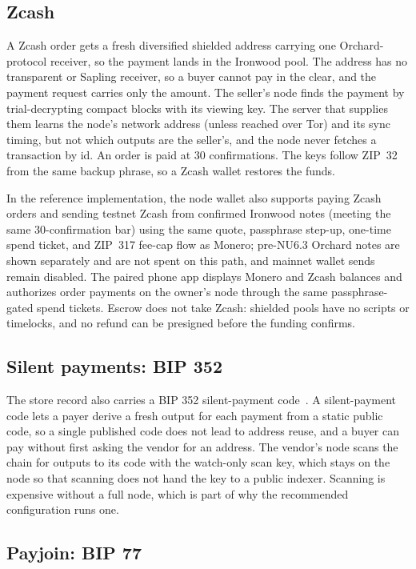 \subsection{Zcash}

A Zcash order gets a fresh diversified shielded address carrying one Orchard-protocol receiver, so the payment lands in the Ironwood pool. The address has no transparent or Sapling receiver, so a buyer cannot pay in the clear, and the payment request carries only the amount. The seller's node finds the payment by trial-decrypting compact blocks with its viewing key. The server that supplies them learns the node's network address (unless reached over Tor) and its sync timing, but not which outputs are the seller's, and the node never fetches a transaction by id. An order is paid at 30 confirmations. The keys follow ZIP~32 from the same backup phrase, so a Zcash wallet restores the funds.

In the reference implementation, the node wallet also supports paying Zcash orders and sending testnet Zcash from confirmed Ironwood notes (meeting the same 30-confirmation bar) using the same quote, passphrase step-up, one-time spend ticket, and ZIP~317 fee-cap flow as Monero; pre-NU6.3 Orchard notes are shown separately and are not spent on this path, and mainnet wallet sends remain disabled. The paired phone app displays Monero and Zcash balances and authorizes order payments on the owner's node through the same passphrase-gated spend tickets. Escrow does not take Zcash: shielded pools have no scripts or timelocks, and no refund can be presigned before the funding confirms.

\subsection{Silent payments: BIP 352}

The store record also carries a BIP 352 silent-payment code~\citep{bip352}. A silent-payment code lets a payer derive a fresh output for each payment from a static public code, so a single published code does not lead to address reuse, and a buyer can pay without first asking the vendor for an address. The vendor's node scans the chain for outputs to its code with the watch-only scan key, which stays on the node so that scanning does not hand the key to a public indexer. Scanning is expensive without a full node, which is part of why the recommended configuration runs one.

\subsection{Payjoin: BIP 77}


